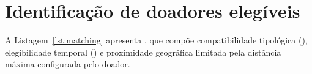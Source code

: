 

\section{Identificação de doadores elegíveis}

A Listagem~\ref{lst:matching} apresenta , que compõe compatibilidade tipológica (), elegibilidade temporal () e proximidade geográfica limitada pela distância máxima configurada pelo doador.


